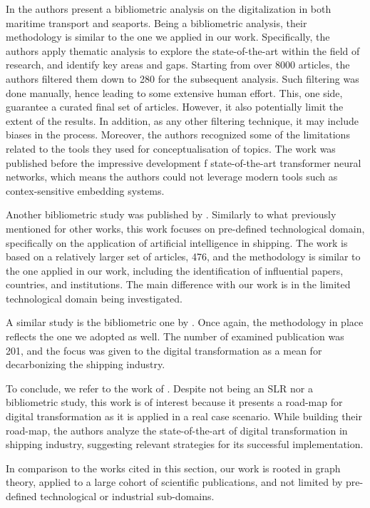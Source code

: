 \documentclass[a4paper, review, endfloat, authoryear]{elsarticle}
\begin{document}
	In \citep{jovic2022digitalization} the authors present a bibliometric analysis on the digitalization in both maritime transport and seaports. Being a bibliometric analysis, their methodology is similar to the one we applied in our work. Specifically, the authors apply thematic analysis to explore the state-of-the-art within the field of research, and identify key areas and gaps. Starting from over 8000 articles, the authors filtered them down to 280 for the subsequent analysis. Such filtering was done manually, hence leading to some extensive human effort. This, one side, guarantee a curated final set of articles. However, it also potentially limit the extent of the results. In addition, as any other filtering technique, it may include biases in the process. Moreover, the authors recognized some of the limitations related to the tools they used for conceptualisation of topics. The work was published before the impressive development f state-of-the-art transformer neural networks, which means the authors could not leverage modern tools such as contex-sensitive embedding systems.
	
	Another bibliometric study was published by \citep{xiao2024application}. Similarly to what previously mentioned for other works, this work focuses on pre-defined technological domain, specifically on the application of artificial intelligence in shipping. The work is based on a relatively larger set of articles, 476, and the methodology is similar to the one applied in our work, including the identification of influential papers, countries, and institutions. The main difference with our work is in the limited technological domain being investigated.
	
	A similar study is the bibliometric one by \citep{xiao2025application}. Once again, the methodology in place reflects the one we adopted as well. The number of examined publication was 201, and the focus was given to the digital transformation as a mean for decarbonizing the shipping industry.
	
	To conclude, we refer to the work of \citep{filippopoulos2022road}. Despite not being an SLR nor a bibliometric study, this work is of interest because it presents a road-map for digital transformation as it is applied in a real case scenario. While building their road-map, the authors analyze the state-of-the-art of digital transformation in shipping industry, suggesting relevant strategies for its successful implementation.
	
	In comparison to the works cited in this section, our work is rooted in graph theory, applied to a large cohort of scientific publications, and not limited by pre-defined technological or industrial sub-domains.
	
\end{document}
